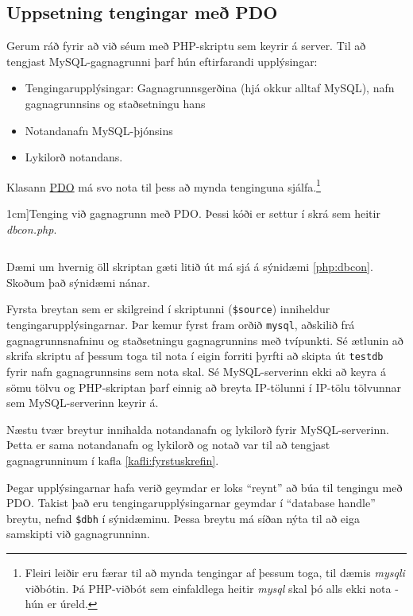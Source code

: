 \subsection{Uppsetning tengingar með PDO}
Gerum ráð fyrir að við séum með PHP-skriptu sem keyrir á server. Til að tengjast MySQL-gagnagrunni þarf hún eftirfarandi upplýsingar:
\begin{itemize}
 \item Tengingarupplýsingar: Gagnagrunnsgerðina (hjá okkur alltaf MySQL), nafn gagnagrunnsins og staðsetningu hans
 \item Notandanafn MySQL-þjónsins
 \item Lykilorð notandans.
\end{itemize}
Klasann \href{http://www.php.net/manual/en/class.pdo.php}{PDO} má svo nota til þess að mynda tenginguna sjálfa.\footnote{Fleiri leiðir eru færar til að mynda tengingar af þessum toga, til dæmis \emph{mysqli} viðbótin. Þá PHP-viðbót sem einfaldlega heitir \emph{mysql} skal þó alls ekki nota - hún er úreld.}

\begin{example}
\caption[Tenging við gagnagrunn með PDO][1cm]{Tenging við gagnagrunn með PDO. Þessi kóði er settur í skrá sem heitir \emph{dbcon.php}.}
\label{php:dbcon}
\centering
\inputminted[frame=lines, fontfamily=courier]{php}{php/dbcon.php}
\end{example}

Dæmi um hvernig öll skriptan gæti litið út má sjá á sýnidæmi \ref{php:dbcon}. Skoðum það sýnidæmi nánar.

Fyrsta breytan sem er skilgreind í skriptunni (\verb|$source|) inniheldur tengingarupplýsingarnar. Þar kemur fyrst fram orðið \verb|mysql|, aðskilið frá gagnagrunnsnafninu og staðsetningu gagnagrunnins með tvípunkti. Sé ætlunin að skrifa skriptu af þessum toga til nota í eigin forriti þyrfti að skipta út \verb|testdb| fyrir nafn gagnagrunnsins sem nota skal. Sé MySQL-serverinn ekki að keyra á sömu tölvu og PHP-skriptan þarf einnig að breyta IP-tölunni í IP-tölu tölvunnar sem MySQL-serverinn keyrir á.

Næstu tvær breytur innihalda notandanafn og lykilorð fyrir MySQL-serverinn. Þetta er sama notandanafn og lykilorð og notað var til að tengjast gagnagrunninum í kafla \ref{kafli:fyrstuskrefin}.

Þegar upplýsingarnar hafa verið geymdar er loks ``reynt'' að búa til tengingu með PDO. Takist það eru tengingarupplýsingarnar geymdar í  ``database handle'' breytu, nefnd \verb|$dbh| í sýnidæminu. Þessa breytu má síðan nýta til að eiga samskipti við gagnagrunninn.

